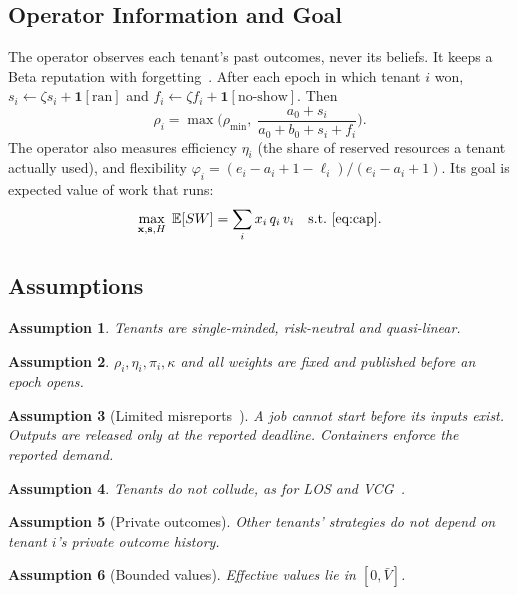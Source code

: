 \documentclass[journal]{IEEEtran}
\newtheorem{assumption}{Assumption}
\theoremstyle{remark}
\newcommand{\E}{\mathbb{E}}
\begin{document}
\subsection{Operator Information and Goal}
The operator observes each tenant's past outcomes, never its beliefs. It keeps a Beta reputation with forgetting~\cite{josang2002}. After each epoch in which tenant $i$ won, $s_i\gets\zeta s_i+\mathbf{1}[\text{ran}]$ and $f_i\gets\zeta f_i+\mathbf{1}[\text{no-show}]$. Then
\begin{equation}\label{eq:rho}
\rho_i=\max\!\Big(\rho_{\min},\;\frac{a_0+s_i}{a_0+b_0+s_i+f_i}\Big).
\end{equation}
The operator also measures efficiency $\eta_i$ (the share of reserved resources a tenant actually used), and flexibility $\varphi_i=(e_i-a_i+1-\ell_i)/(e_i-a_i+1)$. Its goal is expected value of work that runs:
\begin{equation}\label{eq:obj}
\max_{\mathbf{x},\mathbf{s},H}\;\E[SW]=\sum_i x_i\,q_i\,v_i\quad\text{s.t.~\eqref{eq:cap}}.
\end{equation}

\subsection{Assumptions}
\begin{assumption}\label{as:quasi}
Tenants are single-minded, risk-neutral and quasi-linear.
\end{assumption}
\begin{assumption}\label{as:public}
$\rho_i,\eta_i,\pi_i,\kappa$ and all weights are fixed and published before an epoch opens.
\end{assumption}
\begin{assumption}[Limited misreports~\cite{hajiaghayi2004,porter2004}]\label{as:window}
A job cannot start before its inputs exist. Outputs are released only at the reported deadline. Containers enforce the reported demand.
\end{assumption}
\begin{assumption}\label{as:collusion}
Tenants do not collude, as for LOS and VCG~\cite{lehmann2002,rothkopf2007}.
\end{assumption}
\begin{assumption}[Private outcomes]\label{as:private}
Other tenants' strategies do not depend on tenant $i$'s private outcome history.
\end{assumption}
\begin{assumption}[Bounded values]\label{as:bounded}
Effective values lie in $[0,\bar V]$.
\end{assumption}
\end{document}
